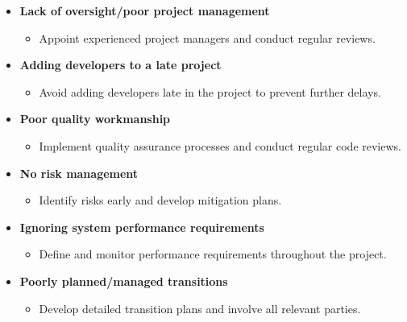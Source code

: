 \documentclass[10pt]{article}
\begin{document}
\begin{multicols}{5}
        \begin{block}
        \begin{itemize}
          \item \textbf{Lack of oversight/poor project management}
          \begin{itemize}
            \item Appoint experienced project managers and conduct regular reviews.
          \end{itemize}
          \item \textbf{Adding developers to a late project}
          \begin{itemize}
            \item Avoid adding developers late in the project to prevent further delays.
          \end{itemize}
        \end{itemize}
        \end{block}
        
        \begin{block}
        \begin{itemize}
          \item \textbf{Poor quality workmanship}
          \begin{itemize}
            \item Implement quality assurance processes and conduct regular code reviews.
          \end{itemize}
          \item \textbf{No risk management}
          \begin{itemize}
            \item Identify risks early and develop mitigation plans.
          \end{itemize}
          \item \textbf{Ignoring system performance requirements}
          \begin{itemize}
            \item Define and monitor performance requirements throughout the project.
          \end{itemize}
          \item \textbf{Poorly planned/managed transitions}
          \begin{itemize}
            \item Develop detailed transition plans and involve all relevant parties.
          \end{itemize}
        \end{itemize}
        \end{block}


\end{multicols}
\end{document}
